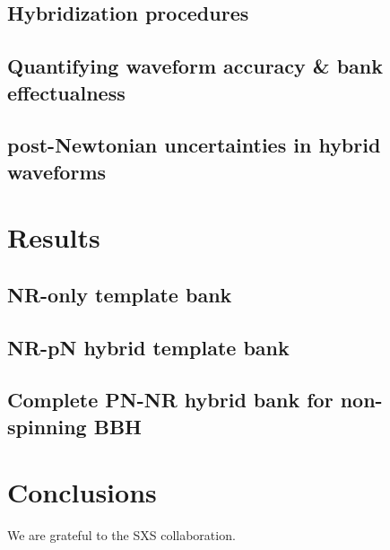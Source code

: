 \documentclass[aps,
prd,
amsmath,
amssymb,
twocolumn,
floatfix,
groupedaddress]{revtex4-1}
\begin{document}
\subsection{Hybridization procedures}\label{s2:NRpNhybridwaveforms}


\subsection{Quantifying waveform accuracy \& bank
  effectualness}\label{s2:quantifyingerrors} 



\subsection{post-Newtonian uncertainties in hybrid waveforms}\label{s2:pNuncertainties}



\section{Results}\label{s1:results}

\subsection{NR-only template bank}\label{s2:NRonlybank}


\subsection{NR-pN hybrid template bank}\label{s2:NRpNhybridbank}


\subsection{Complete PN-NR hybrid bank for non-spinning BBH}\label{s2:futureNRpNhybridbank}


\section{Conclusions}\label{s1:conclusions}


\acknowledgments
We are grateful to the SXS collaboration. 
\end{document}
